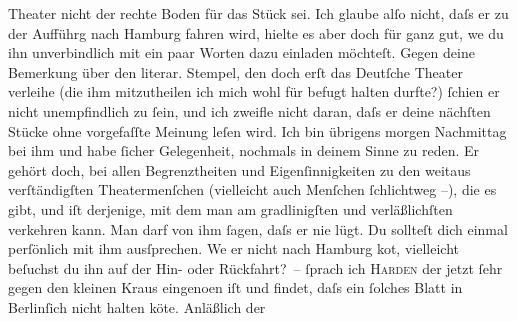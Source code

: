 \begin{ledgroupsized}[t]{13cm}
                  Theater nicht der rechte Boden für das Stück sei. Ich glaube alſo nicht, daſs
               er zu der Aufführg nach Hamburg fahren wird, hielte
               es aber doch für ganz gut, we{\geminationn} du ihn unverbindlich mit
               ein paar {\pb}Worten dazu
               einladen möchteſt. Gegen deine Bemerkung über den literar. Stempel, den doch erſt das
                  Deutſche Theater verleihe (die ihm mitzutheilen ich
               mich wohl für befugt halten durfte?) ſchien er nicht unempfindlich zu ſein, und ich
               zweifle nicht daran, daſs er deine nächſten Stücke ohne vorgefaſſte Meinung leſen
               wird. Ich bin übrigens mor{\pb}gen Nachmittag bei ihm
               und habe ſicher Gelegenheit, nochmals in deinem Sinne zu reden. Er gehört doch, bei
               allen Begrenztheiten und Eigenſinnigkeiten zu den weitaus verſtändigſten
               Theatermenſchen \introOben{}(vielleicht auch Menſchen ſchlichtweg –)\introOben{},
               die es gibt, und iſt derjenige, mit dem man am gradlinigſten und verläßlichſten
               verkehren kann. Man darf von ihm ſagen, daſs {\pb}er nie lügt. Du
               sollteſt dich einmal perſönlich mit ihm ausſprechen. We{\geminationn}
               er nicht nach Hamburg ko{\geminationm}t, vielleicht beſuchst du ihn auf der Hin- oder Rückfahrt? – \pend
           \pstart
           \label{K_L01195_1v}\label{K_L01195_1h}{ }ſprach ich \textsc{Harden}\damage{,} der jetzt ſehr gegen den kleinen Kraus
                  eingeno{\geminationm}en iſt und findet, daſs ein ſolches Blatt in Berlinſich nicht halten kö{\geminationn}te. {\pb}Anläßlich der

\end{ledgroupsized}
